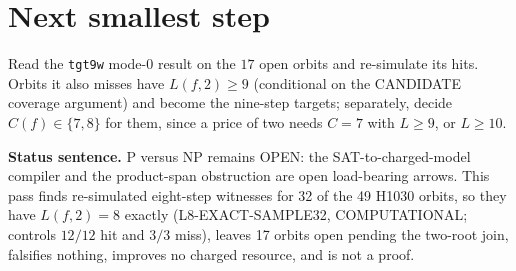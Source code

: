 \documentclass[11pt]{article}
\begin{document}
\section*{Next smallest step}
Read the \texttt{tgt9w} mode-0 result on the $17$ open orbits and re-simulate its hits. Orbits it also misses have $L(f,2)\ge9$ (conditional on the CANDIDATE coverage argument) and become the nine-step targets; separately, decide $C(f)\in\{7,8\}$ for them, since a price of two needs $C=7$ with $L\ge9$, or $L\ge10$.

\bigskip
\noindent\textbf{Status sentence.} P versus NP remains OPEN: the SAT-to-charged-model compiler and the product-span obstruction are open load-bearing arrows. This pass finds re-simulated eight-step witnesses for 32 of the 49 H1030 orbits, so they have $L(f,2)=8$ exactly (L8-EXACT-SAMPLE32, COMPUTATIONAL; controls $12/12$ hit and $3/3$ miss), leaves 17 orbits open pending the two-root join, falsifies nothing, improves no charged resource, and is not a proof.
\end{document}
